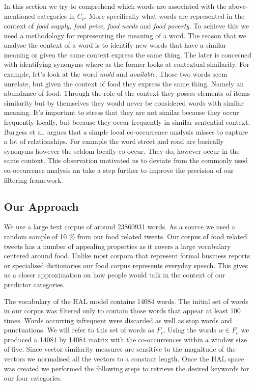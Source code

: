 \documentclass[12pt]{report}
\begin{document}
In this section we try to comprehend which words are associated with the above-mentioned categories in $C_p$. More specifically what words are represented in the context of \emph{food supply, food price, food needs} and \emph{food poverty}. To achieve this we need a methodology for representing the meaning of a word. The reason that we analyse the context of a word is to identify new words that have a similar meaning or given the same context express the same thing. The later is concerned with identifying synonyms where as the former looks at contextual similarity. For example, let's look at the word \emph {mold} and \emph {available}. Those two words seem unrelate, but given the context of food they express the same thing.  Namely an abundance of food. Through the role  of the context they posses elements of items similarity but by themselves they would never be considered words with similar meaning. It's important to stress that they are not similar because they occur frequently locally, but because they occur frequently in similar sentential context. Burgess et al. \cite{burgess98} argues that a simple local co-occurrence analysis misses to capture a lot of relationships. For example the word street and road are basically synonyms however the seldom locally co-occur. They do, however occur in the same context. This observation motivated us to deviate from the commonly used co-occurrence analysis an take a step further to improve the precision of our filtering framework. 



\subsection{Our Approach}

We use a large text corpus of around 23860931 words. As a source we used a random sample of 10 \% from our food related tweets. Our corpus of food related tweets has a number of appealing properties as it covers a large vocabulary centered around food. Unlike most corpora that represent formal business reports or specialised dictionaries our food corpus represents everyday speech. This gives us a closer approximation on how people would talk in the context of our predictor categories. 

The vocabulary of the HAL model contains 14084 words. The initial set of words in our corpus was filtered only to contain those words that appear at least 100 times. Words occurring infrequent were discarded as well as stop words and punctuations. We will refer to this set of words as $F_c$. Using the words $w \in F_c$ we produced a 14084 by 14084 matrix with the co-occurrences within a window size of five. Since vector similarity measures are sensitive to the magnitude of the vectors we normalised all the vectors to a constant length. Once the HAL space was created we performed the following steps to retrieve the desired keywords for our four categories. 
\end{document}
